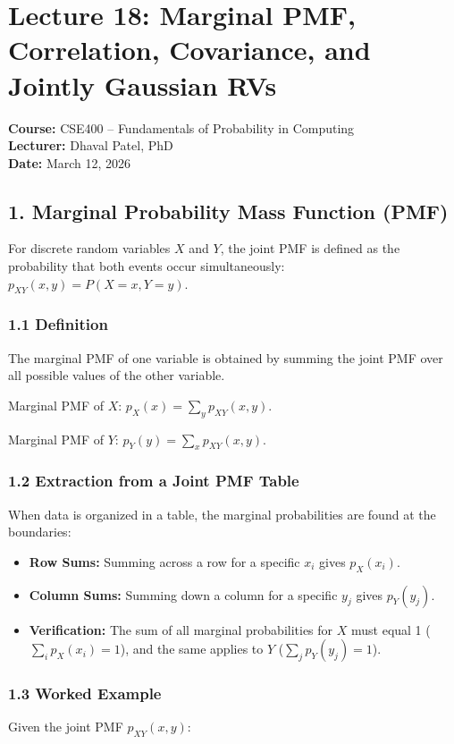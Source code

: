 \documentclass{article}
\begin{document}
\section*{Lecture 18: Marginal PMF, Correlation, Covariance, and Jointly Gaussian RVs}

\textbf{Course:} CSE400 – Fundamentals of Probability in Computing \\
\textbf{Lecturer:} Dhaval Patel, PhD \\
\textbf{Date:} March 12, 2026

\subsection*{1. Marginal Probability Mass Function (PMF)}
For discrete random variables $X$ and $Y$, the joint PMF is defined as the probability that both events occur simultaneously: $p_{XY}(x,y) = P(X=x, Y=y)$.

\subsubsection*{1.1 Definition}
The marginal PMF of one variable is obtained by summing the joint PMF over all possible values of the other variable.

Marginal PMF of $X$: $p_{X}(x) = \sum_{y} p_{XY}(x,y)$.

Marginal PMF of $Y$: $p_{Y}(y) = \sum_{x} p_{XY}(x,y)$.

\subsubsection*{1.2 Extraction from a Joint PMF Table}
When data is organized in a table, the marginal probabilities are found at the boundaries:
\begin{itemize}
    \item \textbf{Row Sums:} Summing across a row for a specific $x_i$ gives $p_X(x_i)$.
    \item \textbf{Column Sums:} Summing down a column for a specific $y_j$ gives $p_Y(y_j)$.
    \item \textbf{Verification:} The sum of all marginal probabilities for $X$ must equal 1 ($\sum_{i} p_{X}(x_{i}) = 1$), and the same applies to $Y$ ($\sum_{j} p_{Y}(y_{j}) = 1$).
\end{itemize}

\subsubsection*{1.3 Worked Example}
Given the joint PMF $p_{XY}(x,y)$:
\end{document}
